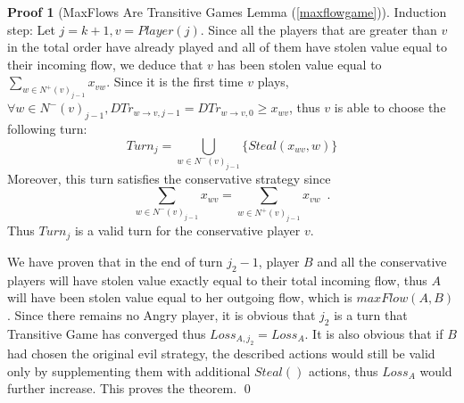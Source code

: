 \documentclass[11pt]{llncs}
\theoremstyle{definition}
\newtheorem{sepproof}{Proof}
\begin{document}
\begin{sepproof}[MaxFlows Are Transitive Games Lemma (\ref{maxflowgame})]
       Induction step: Let $j = k + 1, v = Player\left(j\right)$. Since all the players that are greater than $v$ in the
       total order have already played and all of them have stolen value equal to their incoming flow, we deduce that $v$ has
       been stolen value equal to $\sum\limits_{w \in N^{+}\left(v\right)_{j-1}}x_{vw}$. Since it is the first time $v$
       plays, $\forall w \in N^{-}\left(v\right)_{j-1}, DTr_{w \rightarrow v, j-1} = DTr_{w \rightarrow v, 0} \geq x_{wv}$, thus
       $v$ is able to choose the following turn:
       \begin{equation}
          Turn_j = \bigcup\limits_{w \in N^{-}\left(v\right)_{j-1}}\{Steal\left(x_{wv}, w\right)\}
       \end{equation}
       Moreover, this turn satisfies the conservative strategy since
       \begin{equation}
          \sum\limits_{w \in N^{-}\left(v\right)_{j-1}}x_{wv} = \sum\limits_{w \in N^{+}\left(v\right)_{j-1}}x_{vw} \enspace.
       \end{equation}
       Thus $Turn_j$ is a valid turn for the conservative player $v$.

       We have proven that in the end of turn $j_2 - 1$, player $B$ and all the conservative players will have stolen value
       exactly equal to their total incoming flow, thus $A$ will have been stolen value equal to her outgoing flow, which is
       $maxFlow(A, B)$. Since there remains no Angry player, it is obvious that $j_2$ is a turn that Transitive Game has
       converged thus $Loss_{A, j_2} = Loss_A$. It is also obvious that if $B$ had chosen the original evil strategy, the
       described actions would still be valid only by supplementing them with additional $Steal\left(\right)$ actions, thus
       $Loss_A$ would further increase. This proves the theorem.
       \qed
    \end{sepproof}
\end{document}

